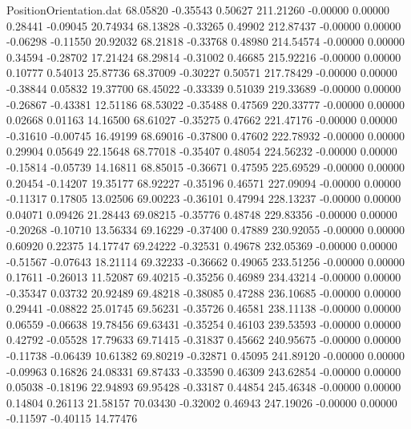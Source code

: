 \begin{filecontents}{PositionOrientation.dat}
  68.05820   -0.35543    0.50627   211.21260   -0.00000    0.00000    0.28441   -0.09045   20.74934
  68.13828   -0.33265    0.49902   212.87437   -0.00000    0.00000   -0.06298   -0.11550   20.92032
  68.21818   -0.33768    0.48980   214.54574   -0.00000    0.00000    0.34594   -0.28702   17.21424
  68.29814   -0.31002    0.46685   215.92216   -0.00000    0.00000    0.10777    0.54013   25.87736
  68.37009   -0.30227    0.50571   217.78429   -0.00000    0.00000   -0.38844    0.05832   19.37700
  68.45022   -0.33339    0.51039   219.33689   -0.00000    0.00000   -0.26867   -0.43381   12.51186
  68.53022   -0.35488    0.47569   220.33777   -0.00000    0.00000    0.02668    0.01163   14.16500
  68.61027   -0.35275    0.47662   221.47176   -0.00000    0.00000   -0.31610   -0.00745   16.49199
  68.69016   -0.37800    0.47602   222.78932   -0.00000    0.00000    0.29904    0.05649   22.15648
  68.77018   -0.35407    0.48054   224.56232   -0.00000    0.00000   -0.15814   -0.05739   14.16811
  68.85015   -0.36671    0.47595   225.69529   -0.00000    0.00000    0.20454   -0.14207   19.35177
  68.92227   -0.35196    0.46571   227.09094   -0.00000    0.00000   -0.11317    0.17805   13.02506
  69.00223   -0.36101    0.47994   228.13237   -0.00000    0.00000    0.04071    0.09426   21.28443
  69.08215   -0.35776    0.48748   229.83356   -0.00000    0.00000   -0.20268   -0.10710   13.56334
  69.16229   -0.37400    0.47889   230.92055   -0.00000    0.00000    0.60920    0.22375   14.17747
  69.24222   -0.32531    0.49678   232.05369   -0.00000    0.00000   -0.51567   -0.07643   18.21114
  69.32233   -0.36662    0.49065   233.51256   -0.00000    0.00000    0.17611   -0.26013   11.52087
  69.40215   -0.35256    0.46989   234.43214   -0.00000    0.00000   -0.35347    0.03732   20.92489
  69.48218   -0.38085    0.47288   236.10685   -0.00000    0.00000    0.29441   -0.08822   25.01745
  69.56231   -0.35726    0.46581   238.11138   -0.00000    0.00000    0.06559   -0.06638   19.78456
  69.63431   -0.35254    0.46103   239.53593   -0.00000    0.00000    0.42792   -0.05528   17.79633
  69.71415   -0.31837    0.45662   240.95675   -0.00000    0.00000   -0.11738   -0.06439   10.61382
  69.80219   -0.32871    0.45095   241.89120   -0.00000    0.00000   -0.09963    0.16826   24.08331
  69.87433   -0.33590    0.46309   243.62854   -0.00000    0.00000    0.05038   -0.18196   22.94893
  69.95428   -0.33187    0.44854   245.46348   -0.00000    0.00000    0.14804    0.26113   21.58157
  70.03430   -0.32002    0.46943   247.19026   -0.00000    0.00000   -0.11597   -0.40115   14.77476

\end{filecontents}
